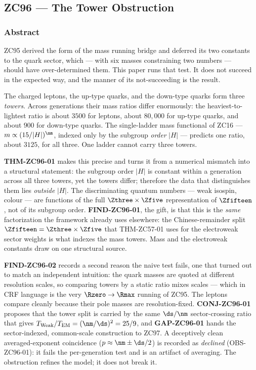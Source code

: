 \documentclass[12pt, a4paper]{article}
\begin{document}


\subsection{ZC96 --- The Tower Obstruction}
\subsubsection*{Abstract}
\sloppy
ZC95 derived the form of the mass running bridge and deferred its two constants
to the quark sector, which --- with six masses constraining two numbers ---
should have over-determined them. This paper runs that test. It does not
succeed in the expected way, and the manner of its not-succeeding is the result.

The charged leptons, the up-type quarks, and the down-type quarks form three
\emph{towers}. Across generations their mass ratios differ enormously: the
heaviest-to-lightest ratio is about $3500$ for leptons, about $80{,}000$ for
up-type quarks, and about $900$ for down-type quarks. The single-ladder mass
functional of ZC16 --- $m\propto(15/|H|)^{\nm}$, indexed only by the subgroup
\emph{order} $|H|$ --- predicts one ratio, about $3125$, for all three. One
ladder cannot carry three towers.

\textbf{THM-ZC96-01} makes this precise and turns it from a numerical
mismatch into a structural statement: the subgroup order $|H|$ is constant
within a generation across all three towers, yet the towers differ; therefore
the data that distinguishes them lies \emph{outside} $|H|$. The discriminating
quantum numbers --- weak isospin, colour --- are functions of the full
$\Zthree\times\Zfive$ representation of $\Zfifteen$, not of its subgroup order.
\textbf{FIND-ZC96-01}, the gift, is that this is the \emph{same} factorization
the framework already uses elsewhere: the Chinese-remainder split
$\Zfifteen=\Zthree\times\Zfive$ that THM-ZC57-01 uses for the electroweak sector
weights is what indexes the mass towers. Mass and the electroweak constants draw
on one structural source.

\textbf{FIND-ZC96-02} records a second reason the naive test fails, one that
turned out to match an independent intuition: the quark masses are quoted at
different resolution scales, so comparing towers by a static ratio mixes scales
--- which in CRF language is the very $\Rzero\to\Rmax$ running of ZC95. The
leptons compare cleanly because their pole masses are resolution-fixed.
\textbf{CONJ-ZC96-01} proposes that the tower split is carried by the same
$\ds/\nm$ sector-crossing ratio that gives $T_{\mathrm{Weak}}/T_{\mathrm{EM}}
=(\nm/\ds)^2=25/9$, and \textbf{GAP-ZC96-01} hands the sector-indexed,
common-scale construction to ZC97. A deceptively clean averaged-exponent
coincidence ($p\approx\nm\pm\ds/2$) is recorded as \emph{declined}
(OBS-ZC96-01): it fails the per-generation test and is an artifact of
averaging. The obstruction refines the model; it does not break it.
\end{document}

